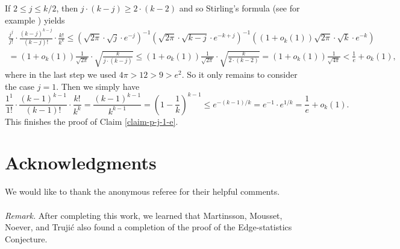 If $2\leq j\leq k/2$, then $j\cdot (k-j)\geq 2\cdot (k-2)$ and so Stirling's formula (see for example \cite{robbins}) yields
\begin{multline*}
\frac{j^j}{j!}\cdot\frac{(k-j)^{k-j}}{(k-j)!}\cdot \frac{k!}{k^k}\leq \left(\sqrt{2\pi}\cdot \sqrt{j}\cdot e^{-j}\right)^{-1} \left(\sqrt{2\pi}\cdot \sqrt{k-j}\cdot e^{-k+j}\right)^{-1} \left((1+o_k(1))\sqrt{2\pi}\cdot \sqrt{k}\cdot e^{-k}\right)\\
=(1+o_k(1)) \frac{1}{\sqrt{2\pi}}\cdot \sqrt{\frac{k}{j\cdot (k-j)}}\leq (1+o_k(1)) \frac{1}{\sqrt{2\pi}}\cdot \sqrt{\frac{k}{2\cdot (k-2)}}=(1+o_k(1)) \frac{1}{\sqrt{4\pi}}< \frac{1}{e}+o_k(1),
\end{multline*}
where in the last step we used $4\pi>12>9>e^2$. So it only remains to consider the case $j=1$. Then we simply have
\[\frac{1^1}{1!}\cdot\frac{(k-1)^{k-1}}{(k-1)!}\cdot \frac{k!}{k^k}=\frac{(k-1)^{k-1}}{k^{k-1}}=\left(1-\frac{1}{k}\right)^{k-1}\leq e^{-(k-1)/k}=e^{-1}\cdot e^{1/k}=\frac{1}{e}+o_k(1).\]
This finishes the proof of Claim \ref{claim-p-j-1-e}.

\section*{Acknowledgments} %
We would like to thank the anonymous referee for their helpful comments.
\\
\\
\noindent\textit{Remark.} After completing this work, we learned that Martinsson, Mousset, Noever, and Truji\'c \cite{martinsson-et-al}  also found a completion of the proof of the Edge-statistics Conjecture.

